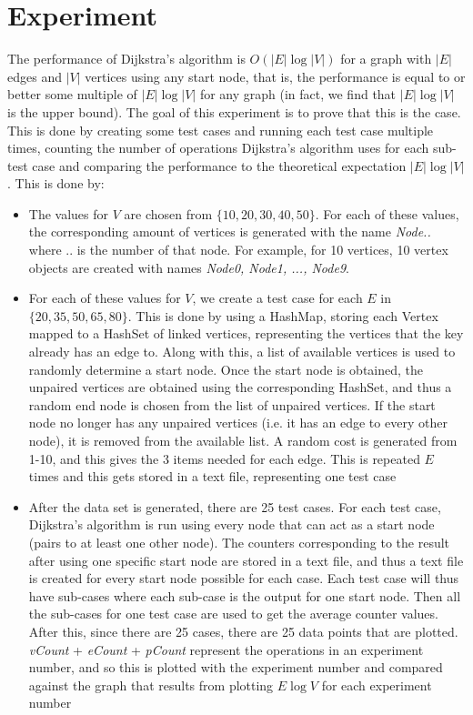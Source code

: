 \documentclass{assignment}
\begin{document}
\newpage 

\section{Experiment}
The performance of Dijkstra's algorithm is $O(|E|\log |V|)$ for a graph with $|E|$ edges and $|V|$ vertices using any start node, that is, the performance is equal to or better some multiple of $|E| \log |V|$ for any graph (in fact, we find that $|E| \log |V|$ is the upper bound). The goal of this experiment is to prove that this is the case. This is done by creating some test cases and running each test case multiple times, counting the number of operations Dijkstra's algorithm uses for each sub-test case and comparing the performance to the theoretical expectation $|E| \log |V|$. This is done by: 
\begin{itemize}
    \item The values for $V$ are chosen from $\{10,20,30,40,50\}$. For each of these values, the corresponding amount of vertices is generated with the name \textit{Node..} where .. is the number of that node. For example, for 10 vertices, 10 vertex objects are created with names \textit{Node0, Node1, ..., Node9}.
    \item For each of these values for $V$, we create a test case for each $E$ in $\{20,35,50,65,80\}$. This is done by using a HashMap, storing each Vertex mapped to a HashSet of linked vertices, representing the vertices that the key already has an edge to. Along with this, a list of available vertices is used to randomly determine a start node. Once the start node is obtained, the unpaired vertices are obtained using the corresponding HashSet, and thus a random end node is chosen from the list of unpaired vertices. If the start node no longer has any unpaired vertices (i.e. it has an edge to every other node), it is removed from the available list. A random cost is generated from 1-10, and this gives the 3 items needed for each edge. This is repeated $E$ times and this gets stored in a text file, representing one test case
    \item After the data set is generated, there are 25 test cases. For each test case, Dijkstra's algorithm is run using every node that can act as a start node (pairs to at least one other node). The counters corresponding to the result after using one specific start node are stored in a text file, and thus a text file is created for every start node possible for each case. Each test case will thus have sub-cases where each sub-case is the output for one start node. Then all the sub-cases for one test case are used to get the average counter values. After this, since there are 25 cases, there are 25 data points that are plotted. \textit{vCount} + \textit{eCount} + \textit{pCount} represent the operations in an experiment number, and so this is plotted with the experiment number and compared against the graph that results from plotting $E \log V$ for each experiment number
\end{itemize}
\newpage
\end{document}
